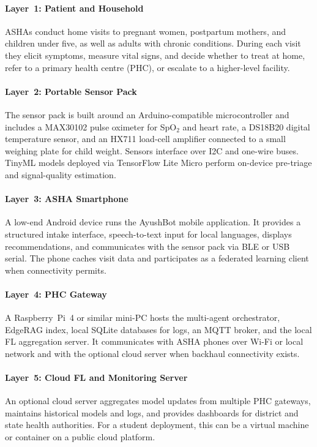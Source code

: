 \documentclass[conference]{IEEEtran}
\begin{document}
\paragraph{Layer~1: Patient and Household}
ASHAs conduct home visits to pregnant women, postpartum mothers, and children under five, as well as adults with chronic conditions. During each visit they elicit symptoms, measure vital signs, and decide whether to treat at home, refer to a primary health centre (PHC), or escalate to a higher-level facility.

\paragraph{Layer~2: Portable Sensor Pack}
The sensor pack is built around an Arduino-compatible microcontroller and includes a MAX30102 pulse oximeter for SpO$_2$ and heart rate, a DS18B20 digital temperature sensor, and an HX711 load-cell amplifier connected to a small weighing plate for child weight. Sensors interface over I2C and one-wire buses. TinyML models deployed via TensorFlow Lite Micro perform on-device pre-triage and signal-quality estimation.

\paragraph{Layer~3: ASHA Smartphone}
A low-end Android device runs the AyushBot mobile application. It provides a structured intake interface, speech-to-text input for local languages, displays recommendations, and communicates with the sensor pack via BLE or USB serial. The phone caches visit data and participates as a federated learning client when connectivity permits.

\paragraph{Layer~4: PHC Gateway}
A Raspberry~Pi~4 or similar mini-PC hosts the multi-agent orchestrator, EdgeRAG index, local SQLite databases for logs, an MQTT broker, and the local FL aggregation server. It communicates with ASHA phones over Wi-Fi or local network and with the optional cloud server when backhaul connectivity exists.

\paragraph{Layer~5: Cloud FL and Monitoring Server}
An optional cloud server aggregates model updates from multiple PHC gateways, maintains historical models and logs, and provides dashboards for district and state health authorities. For a student deployment, this can be a virtual machine or container on a public cloud platform.
\end{document}
